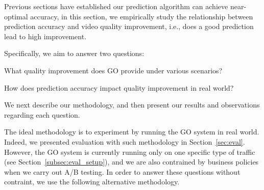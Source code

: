 \label{improvement}

Previous sections have established our prediction algorithm can achieve near-optimal accuracy, in this section, we empirically study the relationship between prediction accuracy and video quality improvement, i.e., does a good prediction lead to high improvement. 

Specifically, we aim to answer two questions:
\begin{packedenumerate}
	\item What quality improvement does GO provide under various scenarios?
	\item How does prediction accuracy impact quality improvement in real world?
\end{packedenumerate}

We next describe our methodology, and then present our results and observations regarding each question.


The ideal methodology is to experiment by running the GO system in real world. Indeed, we presented evaluation with such methodology in Section~\ref{sec:eval}. However, the GO system is currently running only on one specific type of traffic (see Section~\ref{subsec:eval_setup}), and we are also contrained by business policies when we carry out A/B testing. In order to answer these questions without contraint, we use the following alternative methodology.

